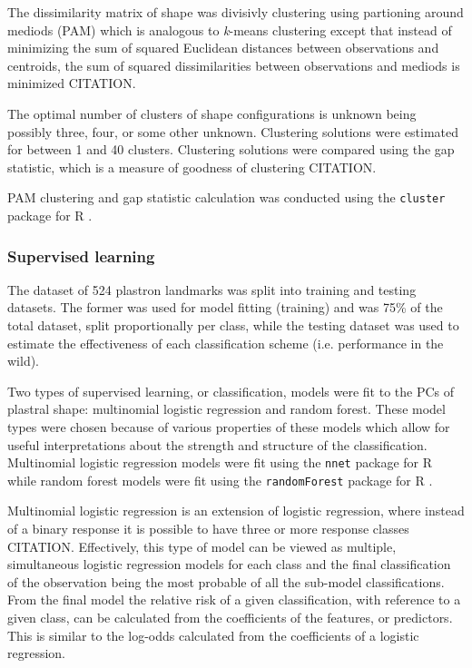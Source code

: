\documentclass[12pt]{article}\usepackage{graphicx, color}
\begin{document}
The dissimilarity matrix of shape was divisivly clustering using partioning around mediods (PAM) which is analogous to \textit{k}-means clustering except that instead of minimizing the sum of squared Euclidean distances between observations and centroids, the sum of squared dissimilarities between observations and mediods is minimized CITATION. 

The optimal number of clusters of shape configurations is unknown being possibly three, four, or some other unknown. Clustering solutions were estimated for between 1 and 40 clusters. Clustering solutions were compared using the gap statistic, which is a measure of goodness of clustering CITATION.

PAM clustering and gap statistic calculation was conducted using the \texttt{cluster} package for R \citep{Maechler2013}.

\subsubsection{Supervised learning}
The dataset of 524 plastron landmarks was split into training and testing datasets. The former was used for model fitting (training) and was 75\% of the total dataset, split proportionally per class, while the testing dataset was used to estimate the effectiveness of each classification scheme (i.e. performance in the wild).

Two types of supervised learning, or classification, models were fit to the PCs of plastral shape: multinomial logistic regression and random forest. These model types were chosen because of various properties of these models which allow for useful interpretations about the strength and structure of the classification. Multinomial logistic regression models were fit using the \texttt{nnet} package for R \citep{Venables2002} while random forest models were fit using the \texttt{randomForest} package for R \citep{Liaw2002}.

Multinomial logistic regression is an extension of logistic regression, where instead of a binary response it is possible to have three or more response classes CITATION. Effectively, this type of model can be viewed as multiple, simultaneous logistic regression models for each class and the final classification of the observation being the most probable of all the sub-model classifications. From the final model the relative risk of a given classification, with reference to a given class, can be calculated from the coefficients of the features, or predictors. This is similar to the log-odds calculated from the coefficients of a logistic regression.
\end{document}
